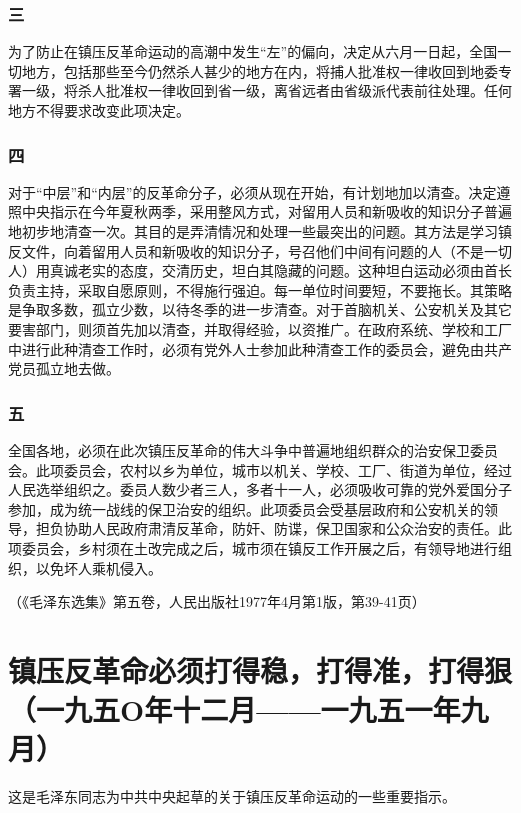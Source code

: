 \documentclass[cn,11pt,chinese]{elegantbook}
\def\myformat#1{\hfil\hfil #1}
\begin{document}
\subsubsection*{\myformat{三}}
为了防止在镇压反革命运动的高潮中发生“左”的偏向，决定从六月一日起，全国一切地方，包括那些至今仍然杀人甚少的地方在内，将捕人批准权一律收回到地委专署一级，将杀人批准权一律收回到省一级，离省远者由省级派代表前往处理。任何地方不得要求改变此项决定。\\
\subsubsection*{\myformat{四}}
对于“中层”和“内层”的反革命分子，必须从现在开始，有计划地加以清查。决定遵照中央指示在今年夏秋两季，采用整风方式，对留用人员和新吸收的知识分子普遍地初步地清查一次。其目的是弄清情况和处理一些最突出的问题。其方法是学习镇反文件，向着留用人员和新吸收的知识分子，号召他们中间有问题的人（不是一切人）用真诚老实的态度，交清历史，坦白其隐藏的问题。这种坦白运动必须由首长负责主持，采取自愿原则，不得施行强迫。每一单位时间要短，不要拖长。其策略是争取多数，孤立少数，以待冬季的进一步清查。对于首脑机关、公安机关及其它要害部门，则须首先加以清查，并取得经验，以资推广。在政府系统、学校和工厂中进行此种清查工作时，必须有党外人士参加此种清查工作的委员会，避免由共产党员孤立地去做。\\
\subsubsection*{\myformat{五}}
全国各地，必须在此次镇压反革命的伟大斗争中普遍地组织群众的治安保卫委员会。此项委员会，农村以乡为单位，城市以机关、学校、工厂、街道为单位，经过人民选举组织之。委员人数少者三人，多者十一人，必须吸收可靠的党外爱国分子参加，成为统一战线的保卫治安的组织。此项委员会受基层政府和公安机关的领导，担负协助人民政府肃清反革命，防奸、防谍，保卫国家和公众治安的责任。此项委员会，乡村须在土改完成之后，城市须在镇反工作开展之后，有领导地进行组织，以免坏人乘机侵入。\\
\begin{flushright}（《毛泽东选集》第五卷，人民出版社1977年4月第1版，第39-41页）\end{flushright}
\newpage\section*{\myformat{镇压反革命必须打得稳，打得准，打得狠}\\\myformat{（一九五O年十二月——一九五一年九月）}}
\begin{introduction}\item  这是毛泽东同志为中共中央起草的关于镇压反革命运动的一些重要指示。\end{introduction}
\end{document}
